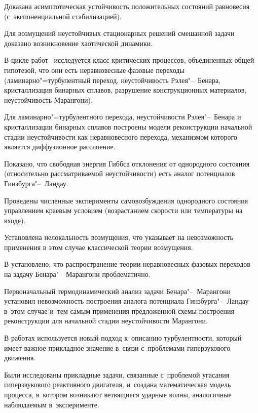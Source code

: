 Доказана асимптотическая устойчивость положительных состояний равновесия (с~экспоненциальной стабилизацией).

Для возмущений неустойчивых стационарных решений смешанной задачи доказано возникновение хаотической динамики.



В цикле работ~\cite{Add, IV.2, IV.4, IV.5, IV.7, IV.8, IV.9, IV.10,  IV.12, IV.13, IV.14, IV.15, IV.16, IV.17, IV.18} исследуется класс критических процессов, объединенных общей гипотезой, что они есть неравновесные фазовые переходы (ламинарно"=турбулентный переход, неустойчивость Рэлея"--~Бенара, кристаллизация бинарных сплавов, разрушение конструкционных материалов, неустойчивость Марангони). 



Для ламинарно"=турбулентного перехода, неустойчивости Рэлея"--~Бенара и кристаллизации бинарных сплавов построены модели реконструкции начальной стадии неустойчивости как неравновесного перехода, механизмом которого является диффузионное расслоение.



Показано, что свободная энергия Гиббса отклонения от однородного состояния (относительно рассматриваемой неустойчивости) есть аналог потенциалов Гинзбурга"--~Ландау. 

Проведены численные эксперименты самовозбуждения однородного состояния управлением краевым условием (возрастанием скорости или температуры на входе). 

Установлена нелокальность возмущения, что указывает на невозможность применения в этом случае классической теории возмущения. 



В \cite{Add} установлено, что распространение теории неравновесных фазовых переходов на задачу Бенара"--~Марангони проблематично. 

Первоначальный термодинамический анализ задачи Бенара"--~Марангони установил невозможность построения аналога потенциала Гинзбурга"--~Ландау в~этом случае и~тем самым применения предложенной схемы построения реконструкции для начальной стадии неустойчивости Марангони. 



В работах \cite{IV.13, IV.14, IV.15, IV.12, IV.9, IV.7} используется новый подход к~описанию турбулентности, который имеет важное прикладное значение в~связи с~проблемами гиперзукового движения. 

Были исследованы прикладные задачи, связанные с~проблемой угасания гиперзвукового реактивного двигателя, и~создана математическая модель процесса, в~котором возникают ветвящиеся ударные волны, аналогичные наблюдаемым в~эксперименте.



